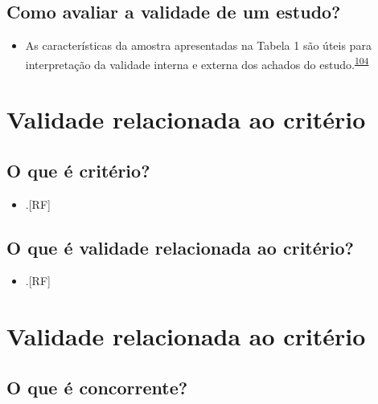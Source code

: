 \documentclass[
  a4paper,
]{book}
\providecommand{\tightlist}{%
  \setlength{\itemsep}{0pt}\setlength{\parskip}{0pt}}
\begin{document}
\hypertarget{como-avaliar-a-validade-de-um-estudo}{%
\subsection{Como avaliar a validade de um estudo?}\label{como-avaliar-a-validade-de-um-estudo}}

\begin{itemize}
\tightlist
\item
  As características da amostra apresentadas na Tabela 1 são úteis para interpretação da validade interna e externa dos achados do estudo.\textsuperscript{\protect\hyperlink{ref-Westreich2013}{104}}
\end{itemize}

\hypertarget{validade-criterio}{%
\section{Validade relacionada ao critério}\label{validade-criterio}}

\hypertarget{o-que-uxe9-crituxe9rio}{%
\subsection{O que é critério?}\label{o-que-uxe9-crituxe9rio}}

\begin{itemize}
\tightlist
\item
  .{[}RF{]}
\end{itemize}

\hypertarget{o-que-uxe9-validade-relacionada-ao-crituxe9rio}{%
\subsection{O que é validade relacionada ao critério?}\label{o-que-uxe9-validade-relacionada-ao-crituxe9rio}}

\begin{itemize}
\tightlist
\item
  .{[}RF{]}
\end{itemize}

\hypertarget{validade-criterio}{%
\section{Validade relacionada ao critério}\label{validade-criterio}}

\hypertarget{o-que-uxe9-concorrente}{%
\subsection{O que é concorrente?}\label{o-que-uxe9-concorrente}}
\end{document}
